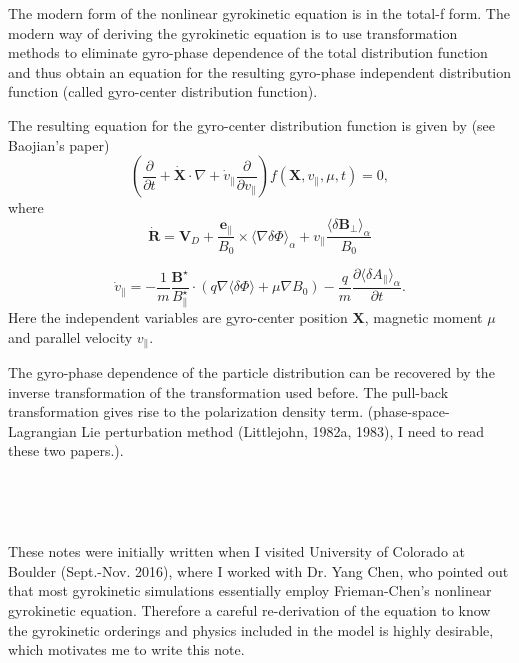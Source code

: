 \documentclass{llncs}
\begin{document}
The modern form of the nonlinear gyrokinetic equation is in the total-f form.
The modern way of deriving the gyrokinetic equation is to use transformation
methods to eliminate gyro-phase dependence of the total distribution function
and thus obtain an equation for the resulting gyro-phase independent
distribution function (called gyro-center distribution function).

The resulting equation for the gyro-center distribution function is given by
(see Baojian's paper)
\begin{equation}
  \left( \frac{\partial}{\partial t} + \dot{\mathbf{X}} \cdot \nabla +
  \dot{v}_{\parallel} \frac{\partial}{\partial v_{\parallel}} \right) f
  (\mathbf{X}, v_{\parallel}, \mu, t) = 0,
\end{equation}
where
\begin{equation}
  \dot{\mathbf{R}} =\mathbf{V}_D + \frac{\mathbf{e}_{\parallel}}{B_0} \times
  \langle \nabla \delta \Phi \rangle_{\alpha} + v_{\parallel} \frac{\langle
  \delta \mathbf{B}_{\perp} \rangle_{\alpha}}{B_0}
\end{equation}

\begin{equation}
  \dot{v}_{\parallel} = - \frac{1}{m} 
  \frac{\mathbf{B}^{\star}}{B_{\parallel}^{\star}} \cdot (q \nabla \langle
  \delta \Phi \rangle + \mu \nabla B_0) - \frac{q}{m}  \frac{\partial \langle
  \delta A_{\parallel} \rangle_{\alpha}}{\partial t} .
\end{equation}
Here the independent variables are gyro-center position $\mathbf{X}$, magnetic
moment $\mu$ and parallel velocity $v_{\parallel}$.

The gyro-phase dependence of the particle distribution can be recovered by
the inverse transformation of the transformation used before. The pull-back
transformation gives rise to the polarization density term.
(phase-space-Lagrangian Lie perturbation method (Littlejohn, 1982a, 1983), I
need to read these two papers.).

\

\

These notes were initially written when I visited University of Colorado at
Boulder (Sept.-Nov. 2016), where I worked with Dr. Yang Chen, who pointed out
that most gyrokinetic simulations essentially employ Frieman-Chen's nonlinear
gyrokinetic equation. Therefore a careful re-derivation of the equation to
know the gyrokinetic orderings and physics included in the model is highly
desirable, which motivates me to write this note.
\end{document}
